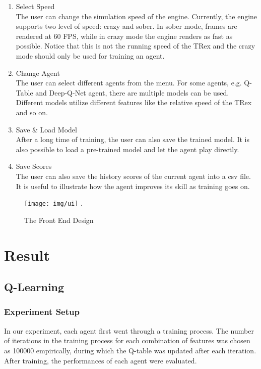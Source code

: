 \documentclass[conference]{IEEEtran}
\begin{document}
\begin{enumerate}
    \item Select Speed\\
    The user can change the simulation speed of the engine. Currently, the engine supports two level of speed: crazy and sober. In sober mode, frames are rendered at 60 FPS, while in crazy mode the engine renders as fast as possible. Notice that this is not the running speed of the TRex and the crazy mode should only be used for training an agent.
    \item Change Agent\\
    The user can select different agents from the menu. For some agents, e.g. Q-Table and Deep-Q-Net agent, there are multiple models can be used. Different models utilize different features like the relative speed of the TRex and so on.
    \item Save \& Load Model\\
    After a long time of training, the user can also save the trained model. It is also possible to load a pre-trained model and let the agent play directly.
    \item Save Scores\\
    The user can also save the history scores of the current agent into a csv file. It is useful to illustrate how the agent improves its skill as training goes on.
\end{enumerate}

\begin{figure}[ht]
\centering
\texttt{[image: img/ui]}
\DeclareGraphicsExtensions.
\caption{The Front End Design}
\label{fig:frontend}
\end{figure}



\section{Result}

\subsection{Q-Learning}

\subsubsection{Experiment Setup}
    In our experiment, each agent first went through a training process. The number of iterations in the training process for each combination of features was chosen as 100000 empirically, during which the Q-table was updated after each iteration. After training, the performances of each agent were evaluated.
    
\end{document}
